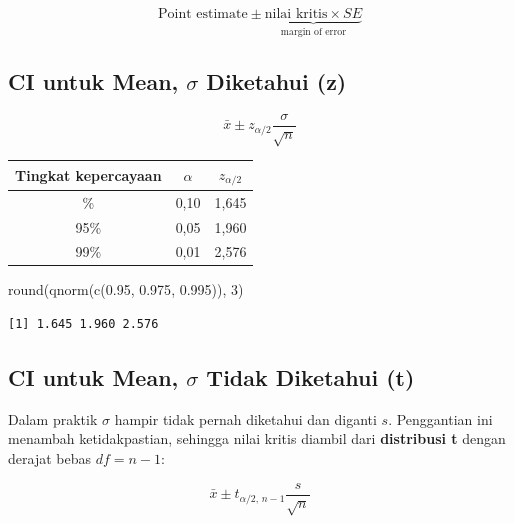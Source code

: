 \documentclass[
  indonesian,
  letterpaper,
]{book}
\newenvironment{Shaded}{\begin{snugshade}}{\end{snugshade}}
\newcommand{\DecValTok}[1]{\textcolor[rgb]{0.68,0.00,0.00}{#1}}
\newcommand{\FloatTok}[1]{\textcolor[rgb]{0.68,0.00,0.00}{#1}}
\newcommand{\FunctionTok}[1]{\textcolor[rgb]{0.28,0.35,0.67}{#1}}
\newcommand{\NormalTok}[1]{\textcolor[rgb]{0.00,0.23,0.31}{#1}}
\newcounter{none} %
\begin{document}
\[
\text{Point estimate} \pm \underbrace{\text{nilai kritis} \times SE}_{\text{margin of error}}
\]

\subsection{\texorpdfstring{CI untuk Mean, \(\sigma\) Diketahui
(z)}{CI untuk Mean, \textbackslash sigma Diketahui (z)}}\label{ci-untuk-mean-sigma-diketahui-z}

\[
\bar{x} \pm z_{\alpha/2} \frac{\sigma}{\sqrt{n}}
\]

{\def\LTcaptype{none} %
\begin{longtable}[]{@{}ccc@{}}
\toprule\noalign{}
Tingkat kepercayaan & \(\alpha\) & \(z_{\alpha/2}\) \\
\midrule\noalign{}
\endhead
\bottomrule\noalign{}
\endlastfoot
90\% & 0,10 & 1,645 \\
95\% & 0,05 & 1,960 \\
99\% & 0,01 & 2,576 \\
\end{longtable}
}

\begin{Shaded}
\begin{Highlighting}[]
\FunctionTok{round}\NormalTok{(}\FunctionTok{qnorm}\NormalTok{(}\FunctionTok{c}\NormalTok{(}\FloatTok{0.95}\NormalTok{, }\FloatTok{0.975}\NormalTok{, }\FloatTok{0.995}\NormalTok{)), }\DecValTok{3}\NormalTok{)}
\end{Highlighting}
\end{Shaded}

\begin{verbatim}
[1] 1.645 1.960 2.576
\end{verbatim}

\subsection{\texorpdfstring{CI untuk Mean, \(\sigma\) Tidak Diketahui
(t)}{CI untuk Mean, \textbackslash sigma Tidak Diketahui (t)}}\label{ci-untuk-mean-sigma-tidak-diketahui-t}

Dalam praktik \(\sigma\) hampir tidak pernah diketahui dan diganti
\(s\). Penggantian ini menambah ketidakpastian, sehingga nilai kritis
diambil dari \textbf{distribusi t} dengan derajat bebas \(df = n-1\):

\[
\bar{x} \pm t_{\alpha/2,\, n-1} \frac{s}{\sqrt{n}}
\]
\end{document}
